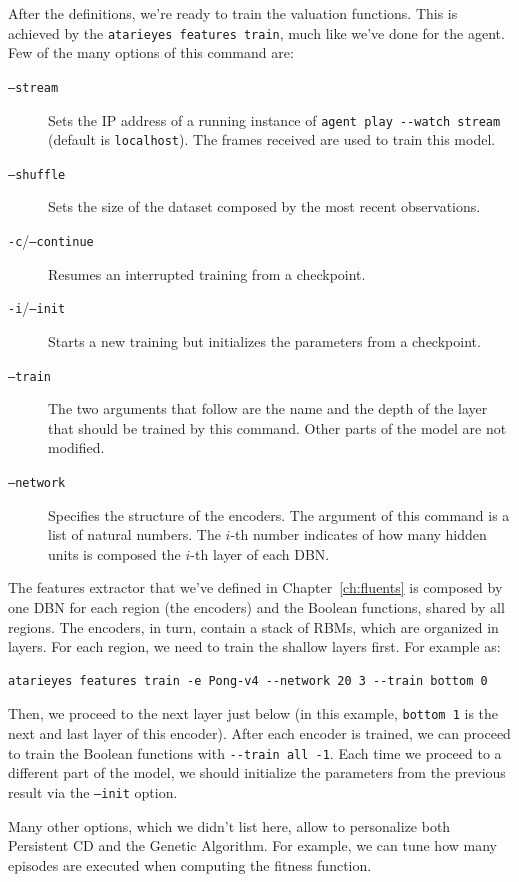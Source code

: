 After the definitions, we're ready to train the valuation functions.
This is achieved by the \lstinline[style=bash]|atarieyes features train|, much
like we've done for the agent. Few of the many options of this command are:
\begin{description}
	\item [\texttt{--stream}] Sets the IP address of a running instance of
		\verb|agent play --watch stream| (default is \texttt{localhost}). The
		frames received are used to train this model.
	\item [\texttt{--shuffle}] Sets the size of the dataset composed by the most
		recent observations.
	\item [\texttt{-c}/\texttt{--continue}] Resumes an interrupted training from 
		a checkpoint.
	\item [\texttt{-i}/\texttt{--init}] Starts a new training but initializes
		the parameters from a checkpoint.
	\item [\texttt{--train}] The two arguments that follow are the name and the
		depth of the layer that should be trained by this command. Other parts of
		the model are not modified.
	\item [\texttt{--network}] Specifies the structure of the encoders. The
		argument of this command is a list of natural numbers. The $i$-th number
		indicates of how many hidden units is composed the $i$-th layer of each
		DBN.
\end{description}
The features extractor that we've defined in Chapter~\ref{ch:fluents} is
composed by one DBN for each region (the encoders) and the Boolean functions,
shared by all regions. The encoders, in turn, contain a stack of RBMs, which
are organized in layers. For each region, we need to train the shallow layers
first. For example as:
\begin{lstlisting}[style=bash, style=nomargin]
atarieyes features train -e Pong-v4 --network 20 3 --train bottom 0
\end{lstlisting}
Then, we proceed to the next layer just below (in this example,
\verb|bottom 1| is the next and last layer of this encoder). After each
encoder is trained, we can proceed to train the Boolean functions with
\verb|--train all -1|. Each time we proceed to a different part of the model,
we should initialize the parameters from the previous result via the
\texttt{--init} option.

Many other options, which we didn't list here, allow to personalize both
Persistent CD and the Genetic Algorithm. For example, we can tune how many
episodes are executed when computing the fitness function.

